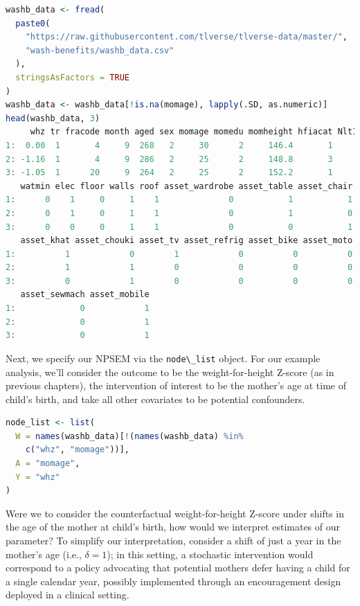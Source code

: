\documentclass[
  12pt, krantz2,
]{krantz}
\newcommand{\passthrough}[1]{#1}
\newcommand{\1}{\mathbbm{1}}
\theoremstyle{definition}
\theoremstyle{definition}
\theoremstyle{definition}
\theoremstyle{definition}
\theoremstyle{remark}
\begin{document}
\begin{lstlisting}[language=R]
washb_data <- fread(
  paste0(
    "https://raw.githubusercontent.com/tlverse/tlverse-data/master/",
    "wash-benefits/washb_data.csv"
  ),
  stringsAsFactors = TRUE
)
washb_data <- washb_data[!is.na(momage), lapply(.SD, as.numeric)]
head(washb_data, 3)
     whz tr fracode month aged sex momage momedu momheight hfiacat Nlt18 Ncomp
1:  0.00  1       4     9  268   2     30      2     146.4       1     3    11
2: -1.16  1       4     9  286   2     25      2     148.8       3     2     4
3: -1.05  1      20     9  264   2     25      2     152.2       1     1    10
   watmin elec floor walls roof asset_wardrobe asset_table asset_chair
1:      0    1     0     1    1              0           1           1
2:      0    1     0     1    1              0           1           0
3:      0    0     0     1    1              0           0           1
   asset_khat asset_chouki asset_tv asset_refrig asset_bike asset_moto
1:          1            0        1            0          0          0
2:          1            1        0            0          0          0
3:          0            1        0            0          0          0
   asset_sewmach asset_mobile
1:             0            1
2:             0            1
3:             0            1
\end{lstlisting}

Next, we specify our NPSEM via the \passthrough{\lstinline!node\_list!} object. For our example analysis,
we'll consider the outcome to be the weight-for-height Z-score (as in previous
chapters), the intervention of interest to be the mother's age at time of
child's birth, and take all other covariates to be potential confounders.

\begin{lstlisting}[language=R]
node_list <- list(
  W = names(washb_data)[!(names(washb_data) %in%
    c("whz", "momage"))],
  A = "momage",
  Y = "whz"
)
\end{lstlisting}

Were we to consider the counterfactual weight-for-height Z-score under shifts in
the age of the mother at child's birth, how would we interpret estimates of our
parameter? To simplify our interpretation, consider a shift of just a year in
the mother's age (i.e., \(\delta = 1\)); in this setting, a stochastic
intervention would correspond to a policy advocating that potential mothers
defer having a child for a single calendar year, possibly implemented through an
encouragement design deployed in a clinical setting.
\end{document}
